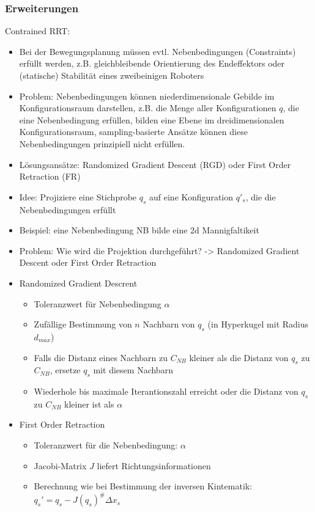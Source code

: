 \documentclass[paper=a4, fontsize=11pt]{scrartcl} %
\numberwithin{equation}{section} %
\numberwithin{figure}{section} %
\numberwithin{table}{section} %
\begin{document}
\subsubsection{Erweiterungen}

Contrained RRT:
\begin{itemize}
\item Bei der Bewegungsplanung müssen evtl. Nebenbedingungen (Constraints) erfüllt werden, z.B. gleichbleibende Orientierung des Endeffektors oder (statische) Stabilität eines zweibeinigen Roboters
\item Problem: Nebenbedingungen können niederdimensionale Gebilde im Konfigurationsraum darstellen, z.B. die Menge aller Konfigurationen $q$, die eine Nebenbedingung erfüllen, bilden eine Ebene im dreidimensionalen Konfigurationsraum, sampling-basierte Ansätze können diese Nebenbedingungen prinzipiell nicht erfüllen.
\item Lösungsansätze: Randomized Gradient Descent (RGD) oder First Order Retraction (FR)
\item Idee: Projiziere eine Stichprobe $q_s$ auf eine Konfiguration $q'_s$, die die Nebenbedingungen erfüllt
\item Beispiel: eine Nebenbedingung NB bilde eine 2d Mannigfaltikeit
\item Problem: Wie wird die Projektion durchgeführt? -> Randomized Gradient Descent oder First Order Retraction
\item Randomized Gradient Descrent
\begin{itemize}
\item Toleranzwert für Nebenbedingung $\alpha$
\item Zufällige Bestimmung von $n$ Nachbarn von $q_s$ (in Hyperkugel mit Radius $d_{max}$)
\item Falls die Distanz eines Nachbarn zu $C_{NB}$ kleiner als die Distanz von $q_s$ zu $C_{NB}$, ersetze $q_s$ mit diesem Nachbarn
\item Wiederhole bis maximale Iterantionszahl erreicht oder die Distanz von $q_s$ zu $C_{NB}$ kleiner ist als $\alpha$
\end{itemize}
\item First Order Retraction
\begin{itemize}
\item Toleranzwert für die Nebenbedingung: $\alpha$
\item Jacobi-Matrix $J$ liefert Richtungsinformationen
\item Berechnung wie bei Bestimmung der inversen Kintematik: $q_s' = q_s - J(q_s)^\# \Delta x_s$
\end{itemize}
\end{itemize}
\end{document}
